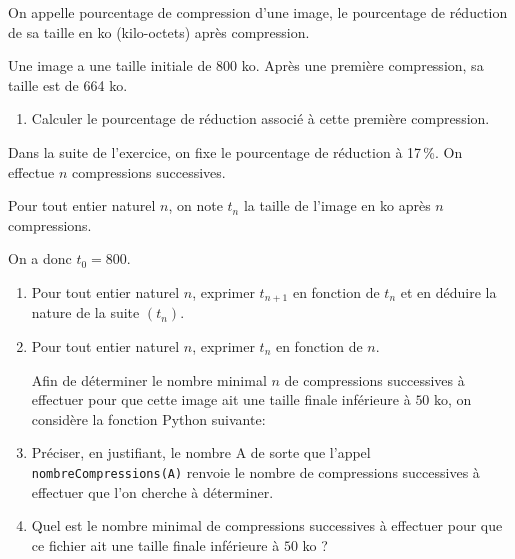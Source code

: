 \medskip

On appelle pourcentage de compression d'une image, le pourcentage de réduction de sa taille en ko (kilo-octets) après compression.

Une image a une taille initiale de 800 ko. Après une première compression, sa taille est de 664 ko.

\medskip

\begin{enumerate}
\item Calculer le pourcentage de réduction associé à cette première compression.
\end{enumerate}

Dans la suite de l'exercice, on fixe le pourcentage de réduction à 17\,\%. On effectue $n$ compressions successives.

Pour tout entier naturel $n$, on note $t_n$ la taille de l'image en ko après $n$ compressions.

On a donc $t_0 = 800$.
\begin{enumerate}[resume]
\item  Pour tout entier naturel $n$, exprimer $t_{n+1}$ en fonction de $t_n$ et en déduire la nature de la suite $\left(t_n\right)$.
\item  Pour tout entier naturel $n$, exprimer $t_n$  en fonction de $n$.

Afin de déterminer le nombre minimal $n$ de compressions successives à effectuer pour que cette image ait une taille finale inférieure à $50$ ko, on considère la fonction Python suivante:

\begin{center}
\end{center}

\item Préciser, en justifiant, le nombre A de sorte que l'appel \texttt{nombreCompressions(A)} renvoie le nombre de compressions successives à effectuer que l'on cherche à déterminer.
\item Quel est le nombre minimal de compressions successives à effectuer pour que ce fichier ait une taille finale inférieure à $50$ ko ?
\end{enumerate}

\bigskip
